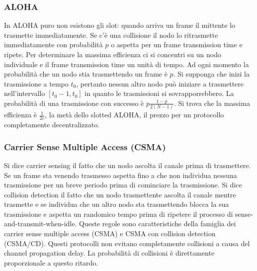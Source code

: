 \subsubsection{ALOHA}
In ALOHA puro non esistono gli slot: quando arriva un frame il mittente lo trasmette immediatamente. Se c'\`e una collisione il nodo lo ritrasmette immediatamente con probabilit\`a $p$ o aspetta per un 
frame transmission time e ripete. Per determinare la massima efficienza ci si concentri su un nodo individuale e il frame transmission time un unit\`a di tempo. Ad ogni momento la probabilit\`a che un nodo 
stia trasmettendo un frame \`e $p$. Si supponga che inizi la trasmissione a tempo $t_0$, pertanto nessun altro nodo pu\`o iniziare a  trasmettere nell'intervallo $[t_0-1, t_0]$ in quanto le trasmissioni si 
sovrapporrebbero. La probabilit\`a di una trasmissione con successo \`e $p\frac{1-p}{2(N-1)}$. Si trova che la massima efficienza \`e $\frac{1}{2e}$, la met\`a dello slotted ALOHA, il prezzo per un protocollo
completamente decentralizzato. 
\subsubsection{Carrier Sense Multiple Access (CSMA)}
Si dice carrier sensing il fatto che un nodo ascolta il canale prima di trasmettere. Se un frame sta venendo trasmesso aspetta fino a che non individua nessuna trasmissione per un breve periodo prima di 
cominciare la trasmissione. Si dice collision detection il fatto che un nodo trasmettente ascolta il canale mentre trasmette e se individua che un altro nodo sta trasmettendo blocca la sua trasmissione e aspetta
un randomico tempo prima di ripetere il processo di sense-and-transmit-when-idle. Queste regole sono caratteristiche della famiglia dei carrier sense multiple access (CSMA) e CSMA con collision detection
(CSMA/CD). Questi protocolli non evitano completamente collisioni a causa del channel propagation delay. La probabilit\`a di collisioni \`e direttamente proporzionale a questo ritardo.
